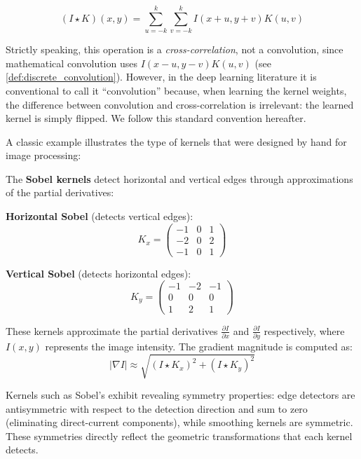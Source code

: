 \begin{equation}
    (I \star K)(x,y) = \sum_{u=-k}^{k}\sum_{v=-k}^{k} I(x+u, y+v)K(u,v)
    \label{eq:convolution2d}
\end{equation}

Strictly speaking, this operation is a \textit{cross-correlation}, not a convolution, since mathematical convolution uses $I(x-u, y-v)K(u,v)$ (see \autoref{def:discrete_convolution}). However, in the deep learning literature it is conventional to call it ``convolution'' because, when learning the kernel weights, the difference between convolution and cross-correlation is irrelevant: the learned kernel is simply flipped. We follow this standard convention hereafter.

A classic example illustrates the type of kernels that were designed by hand for image processing:

\begin{example}\label{ex:kernel_sobel}
The \textbf{Sobel kernels} detect horizontal and vertical edges through approximations of the partial derivatives:

\textbf{Horizontal Sobel} (detects vertical edges):
\[
K_x = \begin{pmatrix}
-1 & 0 & 1 \\
-2 & 0 & 2 \\
-1 & 0 & 1
\end{pmatrix}
\]

\textbf{Vertical Sobel} (detects horizontal edges):
\[
K_y = \begin{pmatrix}
-1 & -2 & -1 \\
0 & 0 & 0 \\
1 & 2 & 1
\end{pmatrix}
\]

These kernels approximate the partial derivatives $\frac{\partial I}{\partial x}$ and $\frac{\partial I}{\partial y}$ respectively, where $I(x,y)$ represents the image intensity. The gradient magnitude is computed as:
\[
|\nabla I| \approx \sqrt{(I \star K_x)^2 + (I \star K_y)^2}
\]
\end{example}

Kernels such as Sobel's exhibit revealing symmetry properties: edge detectors are antisymmetric with respect to the detection direction and sum to zero (eliminating direct-current components), while smoothing kernels are symmetric. These symmetries directly reflect the geometric transformations that each kernel detects.

